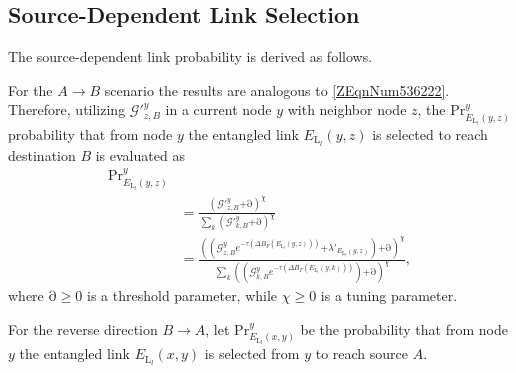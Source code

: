 \documentclass[11pt]{article}%
\begin{document}
\subsection{Source-Dependent Link Selection}
\label{secA1}
The source-dependent link probability is derived as follows.

For the $A\mathrm{\to }B$ scenario the results are analogous to \eqref{ZEqnNum536222}. Therefore, utilizing ${\mathcal{G}}'^y_{z,B}$ in a current node $y$ with neighbor node $z$, the $\mathrm{P}{\mathrm{r}}^y_{E_{{\mathrm{L}}_l}\left(y,z\right)}$ probability that from node $y$ the entangled link $E_{{\mathrm{L}}_l}\left(y,z\right)$ is selected to reach destination $B$ is evaluated as 
\begin{equation} \label{ZEqnNum980976} 
\begin{split}
\mathrm{P}{\mathrm{r}}^y_{E_{{\mathrm{L}}_l}\left(y,z\right)}\\&\mathrm{=}\frac{{\left({\mathcal{G}}'^y_{z,B}\mathrm{+}\mathrm{\partial }\right)}^{\chi }}{\sum_k{{\left({\mathcal{G}}'^y_{k,B}\mathrm{+}\mathrm{\partial }\right)}^{\chi }}}\\&\mathrm{=}\frac{{\left(\left({\mathcal{G}}^y_{z,B}e^{\mathrm{-}\tau \left(\mathit{\Delta}B_F\left(E_{{\mathrm{L}}_l}\left(y,z\right)\right)\right)}\mathrm{+}{\lambda }'_{E_{{\mathrm{L}}_l}\left(y,z\right)}\right)\mathrm{+}\mathrm{\partial }\right)}^{\chi }}{\sum_k{{\left(\left({\mathcal{G}}^y_{k,B}e^{\mathrm{-}\tau \left(\mathit{\Delta}B_F\left(E_{{\mathrm{L}}_l}\left(y,k\right)\right)\right)}\right)\mathrm{+}\mathrm{\partial }\right)}^{\chi }}},                
\end{split}
\end{equation} 
where $\mathrm{\partial }\mathrm{\ge }\mathrm{0}$ is a threshold parameter, while $\chi \mathrm{\ge }\mathrm{0}$ is a tuning parameter.   

For the reverse direction $B\mathrm{\to }A$, let $\mathrm{P}{\mathrm{r}}^y_{E_{{\mathrm{L}}_l}\left(x,y\right)}$ be the probability that from node $y$ the entangled link $E_{{\mathrm{L}}_l}\left(x,y\right)$ is selected from $y$ to reach source $A$. 
\end{document}
